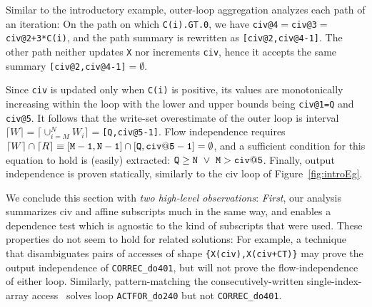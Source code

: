\documentclass{sig-alternate}
\begin{document}
Similar to the introductory example, outer-loop aggregation
analyzes each path of an iteration:
On the path on which {\tt C(i).GT.0}, we have %
{\tt civ@4$=$civ@3$=$civ@2+3*C(i)}, and the path summary is
rewritten as {\tt [civ@2,civ@4-1]}. The other path neither 
updates {\tt X} nor increments {\tt civ}, hence it accepts the
same summary {\tt[civ@2,civ@4-1]$=\emptyset$}.

Since {\tt civ} is updated only when {\tt C(i)} is positive,
its values are monotonically increasing within the loop with
the lower and upper bounds being {\tt civ@1=Q} and {\tt civ@5}. 
It follows that the write-set overestimate of the outer loop is 
interval $\lceil W \rceil = \lceil \cup_{i=M}^{N}W_i\rceil =${\tt[Q,civ@5-1]}.
Flow independence requires   
$\lceil W\rceil\cap\lceil R \rceil \equiv {\tt [M-1,N-1]}\cap{\tt{}[Q,civ@5-1]}=\emptyset$,
and a sufficient condition for this equation to hold is (easily) extracted:
${\tt Q} \ge {\tt N}~\vee~{\tt M} > {\tt{}civ@5}$.
%
Finally, output independence is proven statically, similarly to the 
{\sc civ} loop of Figure~\ref{fig:introEg}.

\vspace{1ex}
We conclude this section with {\em two high-level observations}: %
{\em First}, our analysis summarizes {\sc civ} and affine subscripts
much in the same way, and enables a dependence test which is agnostic
to the kind of subscripts that were used.
%
% 
%
These properties do not seem to hold for related solutions: For example, 
a technique~\cite{CohenBeyondMon} that disambiguates pairs of accesses 
of shape {\tt \{X(civ),X(civ+CT)\}} may prove the output 
independence of {\tt CORREC\_do401}, but will not prove the flow-independence 
of either loop.
Similarly, pattern-matching the consecutively-written single-index-array
access~\cite{PaduaStackArr,VEG} solves loop  {\tt ACTFOR\_do240} but not
{\tt CORREC\_do401}.
\end{document}

